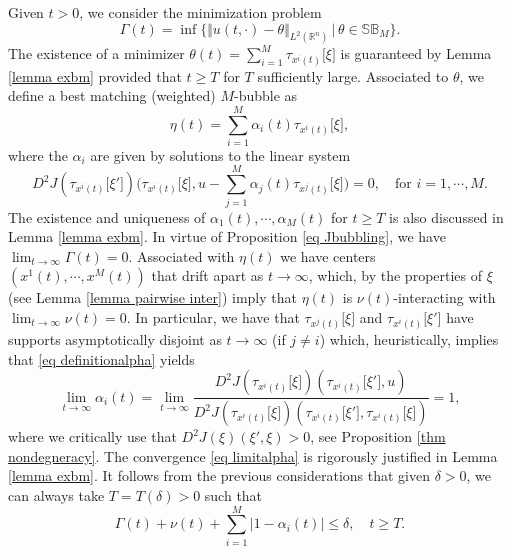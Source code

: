 \documentclass[11pt,letterpaper,reqno]{amsart}
\newcommand{\R}{\mathbb{R}}
\theoremstyle{plain}%
\theoremstyle{definition}
\numberwithin{equation}{section}
\numberwithin{figure}{section}
\begin{document}
Given $t>0$, we consider the minimization problem
	\begin{equation}\label{eq bestmatching}
		\Gamma( t)=	\inf \Big\{  \Vert u(t,\cdot)- \theta \Vert_{L^2(\R^n)} \, |\, \theta \in \mathbb{SB}_M \Big\}.
	\end{equation}
The existence of a minimizer $\theta(t) = \sum_{i=1}^M \tau_{x^i(t)}\big[\xi\big]$ is guaranteed by Lemma \ref{lemma exbm} provided that $t\geq T$ for $T$ sufficiently large. Associated to $\theta$, we define a best matching (weighted) $M$-bubble as
\begin{equation*}
    \eta(t) = \sum_{i=1}^M \alpha_i(t) \tau_{x^i(t)}\big[\xi\big],
\end{equation*}
where the $\alpha_i$ are given by solutions to the linear system
\begin{equation}\label{eq definitionalpha}    D^2J(\tau_{x^i(t)}\big[\xi'\big])\Bigg(\tau_{x^i(t)}\big[\xi\big], u-\sum_{j=1}^M \alpha_j(t) \tau_{x^j(t)}\big[\xi\big]\Bigg)=0, \quad \mbox{for $i=1,\cdots, M$}.
\end{equation}
The existence and uniqueness of $\alpha_1(t), \cdots, \alpha_M(t)$ for $t\geq T$ is also discussed in Lemma \ref{lemma exbm}. In virtue of Proposition \ref{eq Jbubbling}, we have $\lim_{t\to \infty} \Gamma(t)=0$. Associated with $\eta(t)$  we have centers $(x^1(t),\cdots, x^M(t))$ that drift apart as $t\to \infty$, which, by the properties of $\xi$ (see Lemma \ref{lemma pairwise inter}) imply that $\eta(t)$ is $\nu(t)$-interacting with $\lim_{t \to \infty} \nu(t)=0$. In particular, we have that $\tau_{x^j(t)}\big[\xi\big]$ and $\tau_{x^i(t)}\big[\xi'\big]$ have supports asymptotically disjoint as $t\to \infty$ (if $j\neq i$) which, heuristically, implies that \eqref{eq definitionalpha}  yields
\begin{equation}\label{eq limitalpha}
    \lim_{t\to \infty} \alpha_i(t) = \lim_{t\to \infty} \frac{D^2J(\tau_{x^i(t)}\big[\xi\big])(\tau_{x^i(t)}\big[\xi'\big],u)}{D^2J(\tau_{x^i(t)}\big[\xi\big])(\tau_{x^i(t)}\big[\xi'\big],\tau_{x^i(t)}\big[\xi\big])}=1,
\end{equation}
where we critically use that $D^2J(\xi)(\xi', \xi)>0$, see Proposition \ref{thm nondegneracy}. The convergence \eqref{eq limitalpha} is rigorously justified in  Lemma \ref{lemma exbm}. It follows from the previous considerations that  given $\delta>0$, we can always take $T=T(\delta)>0$ such that
\begin{equation}\label{eq smallGammanu}
    \Gamma(t) + \nu(t)+\sum_{i=1}^M |1-\alpha_i(t)| \leq \delta, \quad t\geq T.
\end{equation}
\end{document}
